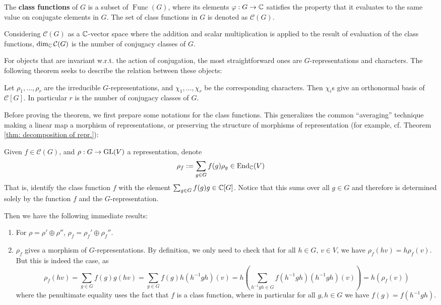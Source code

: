 \begin{definition}
    The \textbf{class functions} of $G$ is a subset of $\operatorname{Func}(G)$, where its elements $\varphi: G \to \mathbb{C}$ satisfies the property that it evaluates to the same value on conjugate elements in $G$. The set of class functions in $G$ is denoted as $\mathcal{C}(G)$. 
\end{definition}

\begin{remark}
    Considering $\mathcal{C}(G)$ as a $\mathbb{C}$-vector space where the addition and scalar multiplication is applied to the result of evaluation of the class functions, $\dim_{\mathbb{C}} \mathcal{C}(G)$ is the number of conjugacy classes of $G$.
\end{remark}

\textstart
For objects that are invariant w.r.t. the action of conjugation, the most straightforward ones are $G$-representations and characters. The following theorem seeks to describe the relation between these objects:

\begin{theorem}\label{thm: character of irred repres gives a basis of C(G)}
    Let $\rho_1, \dots, \rho_r$ are the irreducible $G$-representations, and $\chi_1, \dots, \chi_r$ be the corresponding characters. Then $\chi_i$s give an orthonormal basis of $\mathcal{C}[G]$. In particular $r$ is the number of conjugacy classes of $G$.
\end{theorem}

\textstart
Before proving the theorem, we first prepare some notations for the class functions. This generalizes the common ``averaging'' technique making a linear map a morphism of representations, or preserving the structure of morphisms of representation (for example, cf. Theorem \ref{thm: decomposition of repr.}):

\begin{notation}
    Given $f \in \mathcal{C}(G)$, and $\rho: G \to \mathrm{GL}(V)$ a representation, denote
    \[
        \rho_f := \sum_{g \in G} f(g) \rho_g \in \mathrm{End}_{\mathbb{C}}(V)
    \]
    That is, identify the class function $f$ with the element $\sum_{g \in G} f(g) g \in \mathbb{C}[G]$. Notice that this sums over all $g \in G$ and therefore is determined solely by the function $f$ and the $G$-representation.
\end{notation}

\textstart
Then we have the following immediate results:
\begin{enumerate}[label=\arabic*)]
    \item For $\rho = \rho' \oplus \rho''$, $\rho_f = \rho_f' \oplus \rho_f''$.
    \item $\rho_f$ gives a morphism of $G$-representations. By definition, we only need to check that for all $h \in G$, $v \in V$, we have $\rho_f(hv) = h \rho_f (v)$. But this is indeed the case, as 
    \[
        \rho_f(hv) = \sum_{g \in G} f(g) g(hv) = \sum_{g \in G} f(g) h(h^{-1}gh)(v) = h \left( \sum_{h^{-1}gh \in G} f(h^{-1}gh) (h^{-1}gh)(v)\right) = h(\rho_f(v))
    \]
    where the penultimate equality uses the fact that $f$ is a class function, where in particular for all $g, h \in G$ we have $f(g) = f(h^{-1}gh)$.
\end{enumerate}

